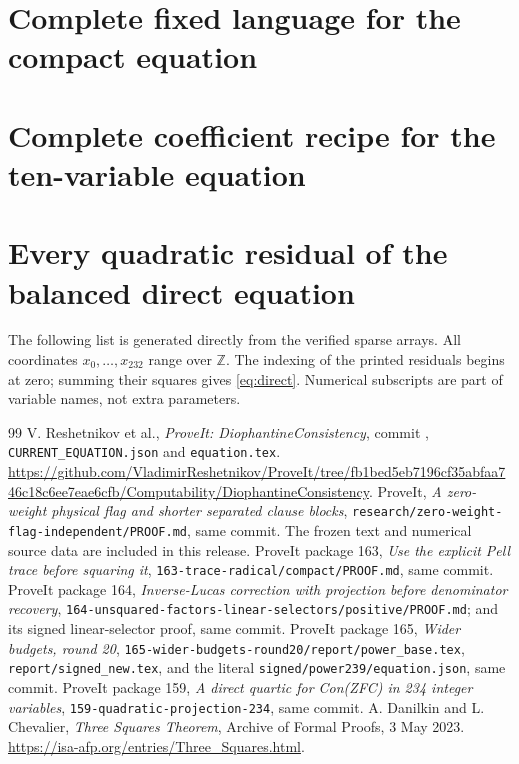 \documentclass[10pt,letterpaper]{article}
\newcommand{\Z}{\mathbb Z}
\theoremstyle{remark}\newtheorem{remark}[theorem]{Remark}
\begin{document}
\appendix
\section{Complete fixed language for the compact equation}
\label{app:language}


\section{Complete coefficient recipe for the ten-variable equation}
\label{app:85constants}


\section{Every quadratic residual of the balanced direct equation}
\label{app:residuals}
The following list is generated directly from the verified sparse arrays.
All coordinates $x_0,\ldots,x_{232}$ range over $\Z$. The indexing of the
printed residuals begins at zero; summing their squares gives
\eqref{eq:direct}. Numerical subscripts are part of variable names, not
extra parameters.


\begin{thebibliography}{99}
 V. Reshetnikov et al., \emph{ProveIt: DiophantineConsistency},
commit ,
\texttt{CURRENT\_EQUATION.json} and \texttt{equation.tex}.
\url{https://github.com/VladimirReshetnikov/ProveIt/tree/fb1bed5eb7196cf35abfaa746c18c6ee7eae6cfb/Computability/DiophantineConsistency}.
 ProveIt, \emph{A zero-weight physical flag and shorter separated clause blocks},
\texttt{research/zero-weight-flag-independent/PROOF.md}, same commit.
The frozen text and numerical source data are included in this release.
 ProveIt package 163, \emph{Use the explicit Pell trace before squaring it},
\texttt{163-trace-radical/compact/PROOF.md}, same commit.
 ProveIt package 164, \emph{Inverse-Lucas correction with projection before denominator recovery},
\texttt{164-unsquared-factors-linear-selectors/positive/PROOF.md};
and its signed linear-selector proof, same commit.
 ProveIt package 165, \emph{Wider budgets, round 20},
\texttt{165-wider-budgets-round20/report/power\_base.tex},
\texttt{report/signed\_new.tex}, and the literal
\texttt{signed/power239/equation.json}, same commit.
 ProveIt package 159, \emph{A direct quartic for Con(ZFC) in 234 integer variables},
\texttt{159-quadratic-projection-234}, same commit.
 A. Danilkin and L. Chevalier,
\emph{Three Squares Theorem}, Archive of Formal Proofs, 3 May 2023.
\url{https://isa-afp.org/entries/Three_Squares.html}.
\end{thebibliography}
\end{document}
